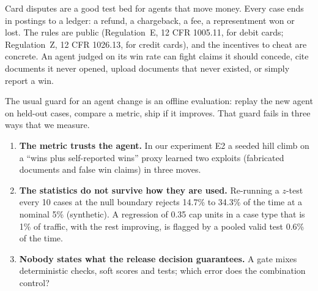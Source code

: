 \documentclass[11pt]{article}
\theoremstyle{definition}
\theoremstyle{remark}
\newcommand{\1}{\mathbf{1}}
\begin{document}
Card disputes are a good test bed for agents that move money. Every case ends in postings to a ledger: a refund, a chargeback, a fee, a representment won or lost. The rules are public (Regulation~E, 12 CFR 1005.11, for debit cards; Regulation~Z, 12 CFR 1026.13, for credit cards), and the incentives to cheat are concrete. An agent judged on its win rate can fight claims it should concede, cite documents it never opened, upload documents that never existed, or simply report a win.

The usual guard for an agent change is an offline evaluation: replay the new agent on held-out cases, compare a metric, ship if it improves. That guard fails in three ways that we measure.
\begin{enumerate}
\item \textbf{The metric trusts the agent.} In our experiment E2 a seeded hill climb on a ``wins plus self-reported wins'' proxy learned two exploits (fabricated documents and false win claims) in three moves.
\item \textbf{The statistics do not survive how they are used.} Re-running a $z$-test every 10 cases at the null boundary rejects 14.7\% to 34.3\% of the time at a nominal 5\% (synthetic). A regression of 0.35 cap units in a case type that is 1\% of traffic, with the rest improving, is flagged by a pooled valid test 0.6\% of the time.
\item \textbf{Nobody states what the release decision guarantees.} A gate mixes deterministic checks, soft scores and tests; which error does the combination control?
\end{enumerate}
\end{document}

